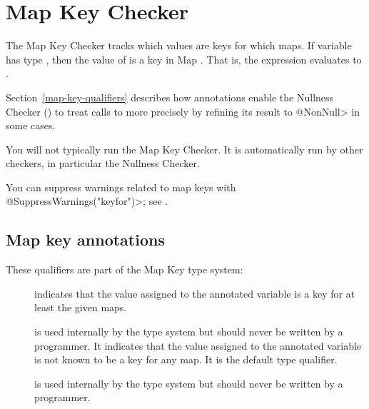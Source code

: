 \htmlhr
\chapter{Map Key Checker\label{map-key-checker}}

The Map Key Checker tracks which values are keys for which maps.  If variable
 has type , then the value of  is a key
in Map .  That is, the expression  evaluates to
.

Section~\ref{map-key-qualifiers} describes how  annotations
enable the
Nullness Checker () to treat calls to
more precisely by refining its result to \<@NonNull> in some cases.

You will not typically run the Map Key Checker.  It is automatically run by
other checkers, in particular the Nullness Checker.

You can suppress warnings related to map keys with
\<@SuppressWarnings("keyfor")>; see .

\section{Map key annotations\label{map-key-annotations}}

These qualifiers are part of the Map Key type system:

\begin{description}

\item[]
  indicates that the value assigned to the annotated variable is a key for at
  least the given maps.

\item[]
  is used internally by the type system but should never be written by a
  programmer.  It indicates that the value assigned to the annotated
  variable is not known to be a key for any map.  It is the default type
  qualifier.

\item[]
  is used internally by the type system but should never be written by a
  programmer.

\end{description}

